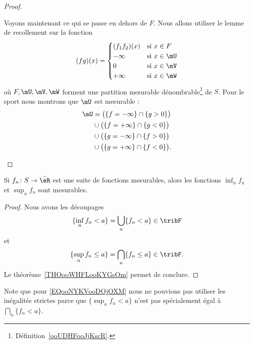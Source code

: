\begin{proof}
\begin{subproof}
\begin{subproof}
            Voyons maintenant ce qui se passe en dehors de \( F\). Nous allons utiliser le lemme de recollement sur la fonction
            \begin{equation}
                (fg)(x)=\begin{cases}
                    (f_1f_2)(x)    &   \text{si } x\in F\\
                    -\infty    &    \text{si } x\in\mU\\
                    0    &    \text{si } x\in \mV\\
                    +\infty    &    \text{si } x\in\mW
                \end{cases}
            \end{equation}
            où \( F,\mU,\mV,\mW\) forment une partition mesurable dénombrable\footnote{Définition~\ref{ooUDHFooJjKscR}.} de \( S\). Pour le sport nous montrons que \( \mU\) est mesurable :
            \begin{subequations}
                \begin{align}
                    \mU&=\big( \{ f=-\infty \}\cap\{ g>0 \} \big)\\
                    &\cup\big( \{ f=+\infty \}\cap\{ g<0 \} \big)\\
                    &\cup\big( \{ g=-\infty \}\cap\{ f>0 \} \big)\\
                    &\cup\big( \{ g=+\infty \}\cap\{ f<0 \}\big).
                \end{align}
            \end{subequations}
        \end{subproof}
    \end{subproof}
\end{proof}

\begin{proposition}     \label{ooABKWooPbfSOZ}
    Si \( f_n\colon S\to \bar \eR\) est une suite de fonctions mesurables, alors les fonctions \( \inf_n f_n\) et \( \sup_nf_n\) sont mesurables.
\end{proposition}

\begin{proof}
    Nous avons les découpages
    \begin{equation}
        \{ \inf_nf_n<a \}=\bigcup_n\{ f_n<a \}\in\tribF
    \end{equation}
    et
    \begin{equation}        \label{EQooNYKVooDOjOXM}
        \{ \sup_nf_n\leq a \}=\bigcap_n\{ f_n\leq a \}\in\tribF.
    \end{equation}
    Le théorème~\ref{THOooWHFLooKYGsOm} permet de conclure.
\end{proof}
Note que pour \eqref{EQooNYKVooDOjOXM} nous ne pouvions pas utiliser les inégalités strictes parce que \( \{ \sup_nf_n<a \}\) n'est pas spécialement égal à \( \bigcap_n\{ f_n<a \}\).

